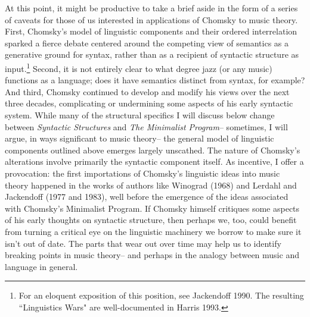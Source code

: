 At this point, it might be productive to take a brief aside in the form of a series of caveats for those of us interested in applications of Chomsky to music theory.  First, Chomsky's model of linguistic components and their ordered interrelation sparked a fierce debate centered around the competing view of semantics as a generative ground for syntax, rather than as a recipient of syntactic structure as input.\footnote{For an eloquent exposition of this position, see Jackendoff 1990.  The resulting ``Linguistics Wars" are well-documented in Harris 1993.}  Second, it is not entirely clear to what degree jazz (or any music) functions as a language; does it have semantics distinct from syntax, for example?  And third, Chomsky continued to develop and modify his views over the next three decades, complicating or undermining some aspects of his early syntactic system.  While many of the structural specifics I will discuss below change between \emph{Syntactic Structures} and \emph{The Minimalist Program}-- sometimes, I will argue, in ways significant to music theory-- the general model of linguistic components outlined above emerges largely unscathed.  The nature of Chomsky's alterations involve primarily the syntactic component itself.  As incentive, I offer a provocation: the first importations of Chomsky's linguistic ideas into music theory happened in the works of authors like Winograd (1968) and Lerdahl and Jackendoff (1977 and 1983), well before the emergence of the ideas associated with Chomsky's Minimalist Program.  If Chomsky himself critiques some aspects of his early thoughts on syntactic structure, then perhaps we, too, could benefit from turning a critical eye on the linguistic machinery we borrow to make sure it isn't out of date.  The parts that wear out over time may help us to identify breaking points in music theory-- and perhaps in the analogy between music and language in general.


